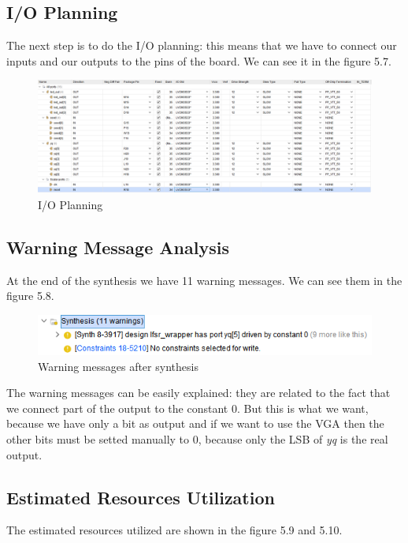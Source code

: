\documentclass[a4paper]{report}
\begin{document}
\subsection{I/O Planning}
The next step is to do the I/O planning: this means that we have to connect our inputs and our outputs to the pins of the board. We can see it in the figure 5.7.
\begin{figure}[htpb]
	\centering
	\includegraphics[scale=0.4]{img/vivado/ioplanning.png}
	\caption{I/O Planning}%
\end{figure}


\subsection{Warning Message Analysis}
At the end of the synthesis we have 11 warning messages. We can see them in the figure 5.8.


\begin{figure}[htpb]
	\centering
	\includegraphics[scale=0.9]{img/vivado/warnings_synthesis.png}
	\caption{Warning messages after synthesis}
\end{figure}

\noindent The warning messages can be easily explained: they are related to the fact that we connect part of the output to the constant 0. But this is what we want, because we have only a bit as output and if we want to use the VGA then the other bits must be setted manually to 0, because only the LSB of \emph{yq} is the real output.

\newpage

\subsection{Estimated Resources Utilization}
The estimated resources utilized are shown in the figure 5.9 and 5.10.
\end{document}
